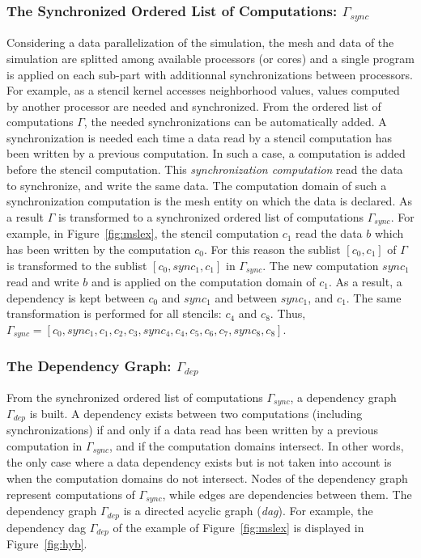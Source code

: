 \subsubsection*{The Synchronized Ordered List of Computations: $\Gamma_{sync}$}
Considering a data parallelization of the simulation, the mesh and data of the simulation are splitted among available processors (or cores) and a single program is applied on each sub-part with additionnal synchronizations between processors. For example, as a stencil kernel accesses neighborhood values, values computed by another processor are needed and synchronized. 
From the ordered list of computations $\Gamma$, the needed synchronizations can be automatically added. A synchronization is needed each time a data read by a stencil computation has been written by a previous computation. In such a case, a computation is added before the stencil computation. This \emph{synchronization computation} read the data to synchronize, and write the same data. The computation domain of such a synchronization computation is the mesh entity on which the data is declared. As a result $\Gamma$ is transformed to a synchronized ordered list of computations $\Gamma_{sync}$.
For example, in Figure~\ref{fig:mslex}, the stencil computation $c_1$ read the data $b$ which has been written by the computation $c_0$. For this reason the sublist $[c_0,c_1]$ of $\Gamma$ is transformed to the sublist $[c_0,sync_1,c_1]$ in $\Gamma_{sync}$. The new computation $sync_1$ read and write $b$ and is applied on the computation domain of $c_1$. As a result, a dependency is kept between $c_0$ and $sync_1$ and between $sync_1$, and $c_1$. The same transformation is performed for all stencils: $c_4$ and $c_8$. Thus, $\Gamma_{sync} = [c_0,sync_1,c_1,c_2,c_3,sync_4,c_4,c_5,c_6,c_7,sync_8,c_8]$.

\subsubsection*{The Dependency Graph: $\Gamma_{dep}$}
From the synchronized ordered list of computations $\Gamma_{sync}$, a dependency graph $\Gamma_{dep}$ is built. A dependency exists between two computations (including synchronizations) if and only if a data read has been written by a previous computation in $\Gamma_{sync}$, and if the computation domains intersect. In other words, the only case where a data dependency exists but is not taken into account is when the computation domains do not intersect. Nodes of the dependency graph represent computations of $\Gamma_{sync}$, while edges are dependencies between them. The dependency graph $\Gamma_{dep}$ is a directed acyclic graph (\emph{dag}). For example, the dependency dag $\Gamma_{dep}$ of the example of Figure~\ref{fig:mslex} is displayed in Figure~\ref{fig:hyb}.

